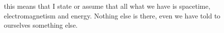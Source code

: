 this means that I state or assume that all what we
have is spacetime, electromagnetism and energy. Nothing else is there, even we
have told to ourselves something else.

